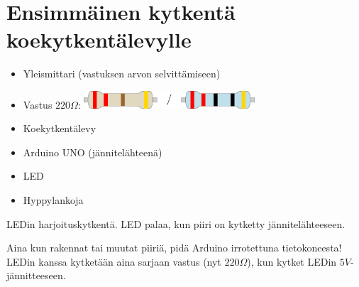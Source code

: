 \begin{center}
\end{center}

\section{Ensimmäinen kytkentä koekytkentälevylle}

\begin{minipage}{0.5\textwidth}
\begin{tcolorbox}[colback=lime!10,title=Tarvikkeet, colbacktitle=green!10,coltitle=black]
\begin{itemize}
    \item Yleismittari (vastuksen arvon selvittämiseen)
    \item Vastus $220\Omega$: \includegraphics[width=0.5\textwidth]{kuvat/220.pdf}
    \item Koekytkentälevy
    \item Arduino UNO (jännitelähteenä)
    \item LED
    \item Hyppylankoja
\end{itemize}
\end{tcolorbox}
\end{minipage}
\begin{minipage}{0.5\textwidth}
\begin{tcolorbox}[colback=blue!10,title=Piirin toiminta,colbacktitle=purple!90]
LEDin harjoituskytkentä. LED palaa, kun piiri on kytketty jännitelähteeseen.
\tcblower
\begin{center}
\end{center}
\end{tcolorbox}
\end{minipage}

\begin{tcolorbox}[colback=red!10,colbacktitle=red,title=HUOM!]
Aina kun rakennat tai muutat piiriä, pidä Arduino irrotettuna tietokoneesta! 
\tcblower
LEDin kanssa kytketään aina sarjaan vastus (nyt $220\Omega$), kun kytket LEDin $5V$- jännitteeseen.
\end{tcolorbox}

